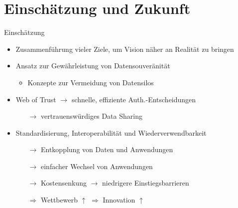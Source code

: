 
\section{Einschätzung und Zukunft}

\begin{frame}[allowframebreaks]{Einschätzung}
    \begin{itemize}
        \item Zusammenführung vieler Ziele, um Vision näher an Realität zu bringen
        
        \item Ansatz zur Gewährleistung von Datensouveränität
        \begin{itemize}
            \item Konzepte zur Vermeidung von Datensilos
        \end{itemize}

        \item Web of Trust $\to$ schnelle, effiziente Auth.-Entscheidungen
        \begin{itemize}
            \item[$\to$] vertrauenswürdiges Data Sharing
        \end{itemize}
        
        \item Standardisierung, Interoperabilität und Wiederverwendbarkeit
        \begin{itemize}
            \item[$\to$] Entkopplung von Daten und Anwendungen
            \item[$\to$] einfacher Wechsel von Anwendungen
            \item[$\to$] Kostensenkung $\to$ niedrigere Einstiegsbarrieren
            \item[$\Rightarrow$] Wettbewerb $\uparrow$ $\Rightarrow$ Innovation $\uparrow$
        \end{itemize}
    \end{itemize}
\end{frame}

